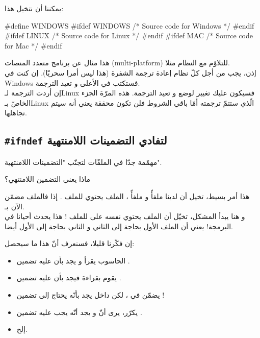 يمكننا أن نتخيل هذا:
\begin{Csource}
#define WINDOWS
#ifdef WINDOWS
  /* Source code for Windows */
#endif
#ifdef LINUX
  /* Source code for Linux */
#endif
#ifdef MAC
  /* Source code for Mac */
#endif
\end{Csource}
هذا مثال عن برنامج متعدد المنصات
(\textenglish{multi-platform})
للتلاؤم مع النظام مثلا.\\
إذن، يجب من أجل كلّ نظام إعادة ترجمة الشفرة (هذا ليس أمرا سحريّا).
إن كنت في
\textenglish{Windows}
فستكتب
في الأعلى و تعيد الترجمة.\\
إن أردت الترجمة لـ\textenglish{Linux}
فسيكون عليك تغيير
لوضع
و تعيد الترجمة. هذه المرّة الجزء الخاصّ بـ\textenglish{Linux}
الّذي ستتمّ ترجمته أمّا باقي الشروط فلن تكون محققة يعني أنه سيتم تجاهلها.

\subsection{\texttt{\#ifndef} لتفادي التضمينات اللامنتهية}
مهمّمة جدّا في الملفّات
لتجنّب "التضمينات اللامنتهية".
\begin{question}
  ماذا يعني التضمين اللامنتهي؟
\end{question}
هذا أمر بسيط، تخيل أن لدينا ملفأً
و ملفأً
،
الملف
يحتوي
للملف
.
إذا فالملف
مضمّن الآن بـ.\\
و هنا يبدأ المشكل، تخيّل أن الملف
يحتوي نفسه على
للملف
!
هذا يحدث أحيانا في البرمجة! يعني أن الملف الأول بحاجة إلى الثاني و الثاني بحاجة إلى الأول أيضا.

إن فكّرنا قليلا، فسنعرف أنّ هذا ما سيحصل:
\begin{itemize}
  \item  الحاسوب يقرأ
و يجد بأن عليه تضمين
.
  \item يقوم بقراءة
فيجد بأن عليه تضمين
.
  \item  يضمّن
في
،
لكن داخل
يجد بأنّه يحتاج إلى تضمين
!
  \item يكرّر، يرى أنّ
و يجد أنّه يجب عليه تضمين
.
  \item إلخ.
\end{itemize}

